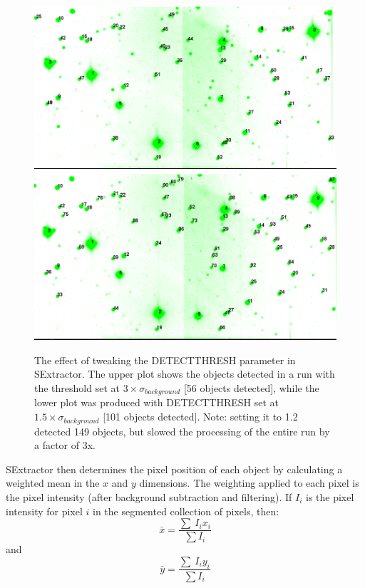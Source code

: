 \begin{figure}
  \centering
  \includegraphics[width=.8\linewidth]{images/2012-09-03_g_default.png}
  \includegraphics[width=.8\linewidth]{images/2012-09-03_g_15sigma.png}
  \caption{The effect of tweaking the DETECT\textunderscore THRESH parameter in SExtractor. The upper plot shows the objects detected in a run with the threshold set at $ 3\times \sigma_{background}$ [56 objects detected], while the lower plot was produced with DETECT\textunderscore THRESH set at $ 1.5\times \sigma_{background}$  [101 objects detected]. Note: setting it to 1.2 detected 149 objects, but slowed the processing of the entire run by a factor of 3x. }
\label{fig:tweakingthreshold}
\end{figure}

SExtractor then determines the pixel position of each object by calculating a weighted mean in the $x$ and $y$ dimensions. The weighting applied to each pixel is the pixel intensity (after background subtraction and filtering). If $I_{i}$ is the pixel intensity for pixel $i$ in the segmented collection of pixels, then: \begin{equation}\bar{x} = \frac{\sum\ I_{i}x_{i}}{\sum I_i}\end{equation} and \begin{equation}\bar{y} = \frac{\sum\ I_{i}y_{i}}{\sum I_i}\end{equation}

